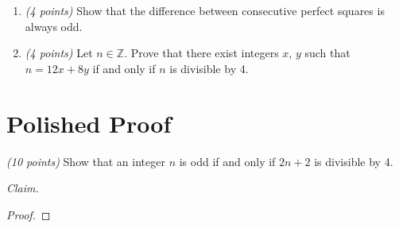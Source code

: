 \documentclass[12pt]{article}
\begin{document}
\begin{enumerate}[label=\textbf{\arabic*.}, itemsep=1.2em]
\item \emph{(4 points)} Show that the difference between consecutive perfect squares is always odd. \newline


\item \emph{(4 points)} Let \(n \in \mathbb{Z}\). Prove that there exist integers \(x\), \(y\) such that \(n = 12x + 8y\) if and only if \(n\) is divisible by 4. \newline


\end{enumerate}
\newpage %

\section*{Polished Proof}

\emph{(10 points)} Show that an integer \(n\) is odd if and only if \(2n + 2\) is divisible by 4. \newline

\noindent \emph{Claim.}

\begin{proof}
\end{proof}
\end{document}
